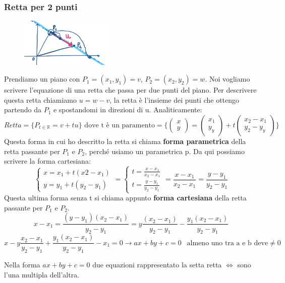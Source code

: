 \subsubsection{Retta per 2 punti}
\begin{figure}
    \vspace{-20pt}
    \centering
    \includegraphics[width=4.5cm]{images/retta-2-punti.png}
\end{figure}
Prendiamo un piano con $P_1 = (x_1, y_1) = v$, $P_2 = (x_2, y_2) = w$. Noi vogliamo scrivere l'equazione di una retta che passa per due punti del piano. Per descrivere questa retta chiamiamo $u = w - v$, la retta è l'insieme dei punti che ottengo partendo da $P_1$ e spostandomi in direzioni di u. Analiticamente:
\[Retta = \{P_{t\in \mathbb{R}} = v + tu\} \text{ dove t è un paramento} = \Bigg\{\begin{pmatrix}x\\y\end{pmatrix} = \begin{pmatrix}x_1\\y_y\end{pmatrix} + t\begin{pmatrix}x_2 - x_1\\y_2 - y_y\end{pmatrix}\Bigg\}\]
Questa forma in cui ho descritto la retta si chiama \textbf{forma parametrica} della retta passante per $P_1$ e $P_2$, perché usiamo un parametrica p. Da qui possiamo scrivere la forma cartesiana:
\[\begin{cases}x = x_1 + t(x2 - x_1)\\ y = y_1 + t(y_2 - y_1)\end{cases} = \begin{cases}t = \frac{x - x_1}{x_2 - x_1}\\t = \frac{y - y_1}{y_2 - y_1}\end{cases} = \frac{x-x_1}{x_2 - x_1} = \frac{y - y_1}{y_2 - y_1}\]
Questa ultima forma senza t si chiama appunto \textbf{forma cartesiana} della retta passante per $P_1$ e $P_2$.
\[x-x_1 = \frac{(y - y_1)(x_2 - x_1)}{y_2 - y_1} = y\frac{(x_2 - x_1)}{y_2 - y_1} - \frac{y_1(x_2 - x_1)}{y_2 - y_1}\]
\[x - y\frac{x_2 - x_1}{y_2 - y_1} + \frac{y_1(x_2 - x_1)}{y_2 - y_1} - x_1 = 0 \rightarrow ax + by + c = 0\:\:  \text{ almeno uno tra a e b deve} \neq 0\]
\begin{observation}
Nella forma $ax + by + c = 0$ due equazioni rappresentato la setta retta $\Longleftrightarrow$ sono l'una multipla dell'altra.
\end{observation}

